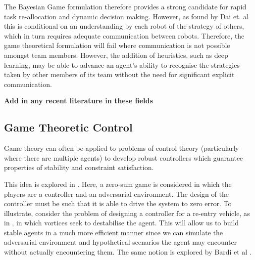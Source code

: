\documentclass[.../main.tex]{subfiles}
\begin{document}
The Bayesian Game formulation therefore provides a strong candidate for rapid task re-allocation and
dynamic decision making. However, as found by Dai et. al \cite{Dai2018TaskSystems} this is
conditional on an understanding by each robot of the strategy of others, which in turn requires
adequate communication between robots. Therefore, the game theoretical formulation will fail where
communication is not possible amongst team members. However, the addition of heuristics, such as
deep learning, may be able to advance an agent’s ability to recognise the strategies taken by other
members of its team without the need for significant explicit communication.

\textbf{Add in any recent literature in these fields}

\subsection{Game Theoretic Control} \label{Game Theoretic Control}

Game theory can often be applied to problems of control theory (particularly where there are
multiple agents) to develop robust controllers which guarantee properties of stability and
constraint satisfaction. 

This idea is explored in \cite{Marden2018AnnualControl}. Here, a zero-sum game is considered in
which the players are a controller and an adversarial environment. The design of the controller must
be such that it is able to drive the system to zero error. To illustrate, consider the problem of
designing a controller for a re-entry vehicle, as in \cite{Breitner1994ReentryGame}, in which
vortices seek to destabilise the agent. This will allow us to build stable agents in a much more
efficient manner since we can simulate the adversarial environment and hypothetical scenarios the
agent may encounter without actually encountering them. The same notion is explored by Bardi et al
\cite{Bardi1991DifferentialDisturbances}.
\end{document}
